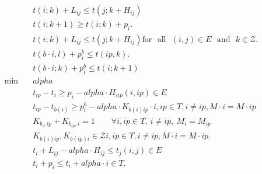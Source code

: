 \begin{align}
  & t \left(i ; k\right) + L_{i j} \leq t \left(j ; k + H_{i j}\right) \tag{eq\_0002} \\
  & t \left(i ; k + 1\right) \geq t \left(i ; k\right) + p_{i} . \tag{eq\_0004} \\
  & t \left(i ; k\right) + L_{i j} \leq t \left(j ; k + H_{i j}\right) \text{for}\textrm{ }\text{all}\textrm{ } \left(i , j\right) \in E \textrm{ }\text{and}\textrm{ } k \in \mathcal{Z} . \tag{eq\_0005} \\
  & t \left(b \cdot i , l\right) + p_{i}^{b} \leq t \left(ip , k\right) . \tag{eq\_0008} \\
  & t \left(b \cdot i ; k\right) + p_{i}^{b} \leq t \left(i ; k + 1\right) \tag{eq\_0010} \\
  \min\quad & \mathit{alpha} \tag{eq\_0011} \\
  & t_{ip} - t_{i} \geq p_{i} - \mathit{alpha} \cdot H_{i ip} \left(i , ip\right) \in E \tag{eq\_0012} \\
  & t_{ip} - t_{b \left(i\right)} \geq p_{i}^{b} - \mathit{alpha} \cdot K_{b \left(i\right) ip} \cdot i , ip \in T , i \neq ip , M \cdot i = M \cdot ip \tag{eq\_0014} \\
  & K_{b_i,ip} + K_{b_{ip},i} = 1 \qquad \forall i,ip \in T,\ i \neq ip,\ M_i = M_{ip} \tag{eq\_0015} \\
  & K_{b \left(i\right) ip} , K_{b \left(ip\right) i} \in \mathcal{Z} i , ip \in T , i \neq ip , M \cdot i = M \cdot ip . \tag{eq\_0016} \\
  & t_{i} + L_{i j} - \mathit{alpha} \cdot H_{i j} \leq t_{j} \left(i , j\right) \in E \tag{eq\_0018} \\
  & t_{i} + p_{i} \leq t_{i} + \mathit{alpha} \cdot i \in T . \tag{eq\_0020} \\
\end{align}

